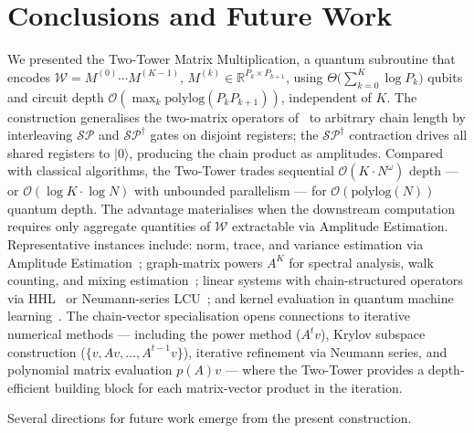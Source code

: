 \documentclass[a4paper,UKenglish,cleveref,autoref,thm-restate]{socg-lipics-v2021}
\providecommand{\ket}[1]{\lvert #1 \rangle}
\newcommand{\SP}{\mathcal{SP}}        %
\begin{document}
\section{Conclusions and Future Work}
\label{sec:conclusions}
We presented the Two-Tower Matrix Multiplication, a quantum subroutine that encodes $\mathcal{W} = M^{(0)}\cdots M^{(K-1)}$, $M^{(k)}\in \mathbb{R}^{P_k\times P_{k+1}}$, using $\Theta\bigl(\sum_{k=0}^{K} \log P_k \bigr)$ qubits and circuit depth $\mathcal{O}(\max_k \mathrm{polylog}(P_k P_{k+1}))$, independent of $K$. The construction generalises the two-matrix operators of~\cite{bernasconiMatMul} to arbitrary chain length by interleaving $\SP$ and $\SP^\dagger$ gates on disjoint registers; the $\SP^\dagger$ contraction drives all shared registers to $\ket{0}$, producing the chain product as amplitudes.
Compared with classical algorithms, the Two-Tower trades sequential $\mathcal{O}(K \cdot N^\omega)$ depth --- or $\mathcal{O}(\log K \cdot \log N)$ with unbounded parallelism --- for $\mathcal{O}(\mathrm{polylog}(N))$ quantum depth. The advantage materialises when the downstream computation requires only aggregate quantities of $\mathcal{W}$ extractable via Amplitude Estimation. Representative instances include: norm, trace, and variance estimation via Amplitude Estimation~\cite{antonioli2025outlier,bernasconi2024quantum,cade2017quantum,poggiali2023quantum};
graph-matrix powers $A^K$ for spectral analysis, walk counting, and
mixing estimation~\cite{nghiem2023quantum,janzing610235bqp};
linear systems with chain-structured operators via
HHL~\cite{harrow2009quantum} or Neumann-series
LCU~\cite{chakraborty_et_al:LIPIcs.ICALP.2019.33};
and kernel evaluation in quantum machine
learning~\cite{biamonte2017quantum,kerenidis_et_al:LIPIcs.ITCS.2017.49}.
The chain-vector specialisation opens connections to iterative
numerical methods --- including the power method ($A^t v$), Krylov
subspace construction ($\{v, Av, \ldots, A^{t-1}v\}$), iterative
refinement via Neumann series, and polynomial matrix evaluation
$p(A)v$ --- where the Two-Tower provides a depth-efficient
building block for each matrix-vector product in the iteration.

Several directions for future work emerge from the present
construction.
\end{document}

